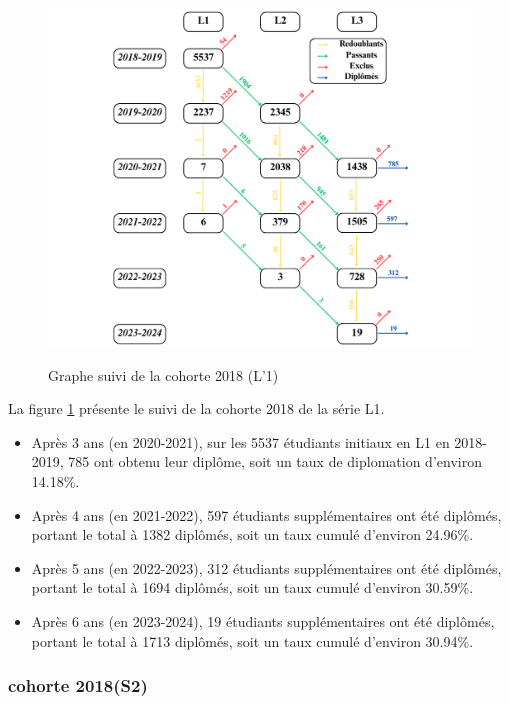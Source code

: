 \begin{figure}[ht]
    \centering
    \caption{Graphe suivi de la cohorte 2018 (L'1)}
    \includegraphics[width=1\textwidth]{figure/L1_2018.png}
    \label{fig:cohorte_l1_2018}
\end{figure}

La figure \ref{fig:cohorte_l1_2018} présente le suivi de la cohorte 2018 de la série L1.
\begin{itemize}
    \item Après 3 ans (en 2020-2021), sur les 5537 étudiants initiaux en L1 en 2018-2019, 785 ont obtenu leur diplôme, soit un taux de diplomation d'environ 14.18\%.
    \item Après 4 ans (en 2021-2022), 597 étudiants supplémentaires ont été diplômés, portant le total à 1382 diplômés, soit un taux cumulé d'environ 24.96\%.
    \item Après 5 ans (en 2022-2023), 312 étudiants supplémentaires ont été diplômés, portant le total à 1694 diplômés, soit un taux cumulé d'environ 30.59\%.
    \item Après 6 ans (en 2023-2024), 19 étudiants supplémentaires ont été diplômés, portant le total à 1713 diplômés, soit un taux cumulé d'environ 30.94\%.
\end{itemize}

\newpage
\subsubsection{cohorte 2018(S2)}

